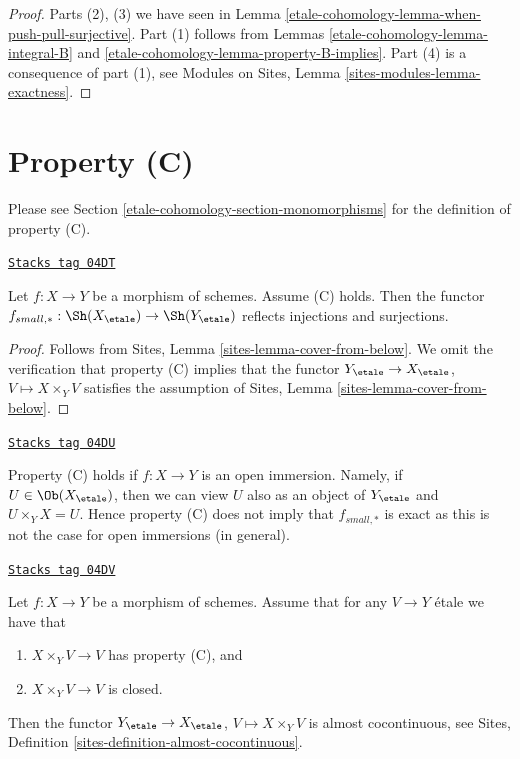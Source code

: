 \begin{proof}
Parts (2), (3) we have seen in
Lemma \ref{etale-cohomology-lemma-when-push-pull-surjective}.
Part (1) follows from
Lemmas \ref{etale-cohomology-lemma-integral-B} and \ref{etale-cohomology-lemma-property-B-implies}.
Part (4) is a consequence of part (1), see
Modules on Sites, Lemma \ref{sites-modules-lemma-exactness}.
\end{proof}

\section{Property (C)}
\label{etale-cohomology-section-C}
Please see Section \ref{etale-cohomology-section-monomorphisms} for the definition of property
(C).

\begin{lemma}
\label{etale-cohomology-lemma-property-C-implies}
\href{https://stacks.math.columbia.edu/tag/04DT}{\texttt{Stacks tag 04DT}}

Let $f : X \to Y$ be a morphism of schemes. Assume (C) holds. Then the functor
$f_{small, *} :
\Sh(X_\etale)
\to
\Sh(Y_\etale)$
reflects injections and surjections.
\end{lemma}

\begin{proof}
Follows from
Sites, Lemma \ref{sites-lemma-cover-from-below}.
We omit the verification that property (C) implies that the functor
$Y_\etale \to X_\etale$, $V \mapsto X \times_Y V$
satisfies the assumption of
Sites, Lemma \ref{sites-lemma-cover-from-below}.
\end{proof}

\begin{remark}
\label{etale-cohomology-remark-property-C-strong}
\href{https://stacks.math.columbia.edu/tag/04DU}{\texttt{Stacks tag 04DU}}

Property (C) holds if $f : X \to Y$ is an open immersion. Namely, if
$U \in \Ob(X_\etale)$, then we can view $U$ also as an object
of $Y_\etale$ and $U \times_Y X = U$. Hence property (C)
does not imply that $f_{small, *}$ is exact as this is not
the case for open immersions (in general).
\end{remark}

\begin{lemma}
\label{etale-cohomology-lemma-property-C-closed-implies}
\href{https://stacks.math.columbia.edu/tag/04DV}{\texttt{Stacks tag 04DV}}

Let $f : X \to Y$ be a morphism of schemes. Assume that
for any $V \to Y$ \'etale we have that
\begin{enumerate}
\item $X \times_Y V \to V$ has property (C), and
\item $X \times_Y V \to V$ is closed.
\end{enumerate}
Then the functor
$Y_\etale \to X_\etale$, $V \mapsto X \times_Y V$
is almost cocontinuous, see
Sites, Definition \ref{sites-definition-almost-cocontinuous}.
\end{lemma}

